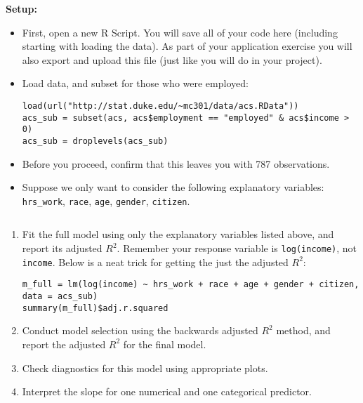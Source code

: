 \documentclass[11pt]{article}
\begin{document}
\pagebreak

\textbf{Setup:}

\begin{itemize}

\item First, open a new R Script. You will save all of your code here (including starting with loading the data). As part of your application exercise you will also export and upload this file (just like you will do in your project).

\item Load data, and subset for those who were employed:

\begin{verbatim}
load(url("http://stat.duke.edu/~mc301/data/acs.RData"))
acs_sub = subset(acs, acs$employment == "employed" & acs$income > 0)
acs_sub = droplevels(acs_sub)
\end{verbatim}

\item Before you proceed, confirm that this leaves you with 787 observations.

\item Suppose we only want to consider the following explanatory variables: \texttt{hrs\_work}, \texttt{race}, \texttt{age}, \texttt{gender}, \texttt{citizen}.

\end{itemize}

$\:$ \\

\begin{enumerate}

\item Fit the full model using only the explanatory variables listed above, and report its adjusted $R^2$. Remember your response variable is \texttt{log(income)}, not \texttt{income}. Below is a neat trick for getting the just the adjusted $R^2$:

\begin{verbatim}
m_full = lm(log(income) ~ hrs_work + race + age + gender + citizen, data = acs_sub)
summary(m_full)$adj.r.squared
\end{verbatim}

\item Conduct model selection using the backwards adjusted $R^2$ method, and report the adjusted $R^2$ for the final model.

\item Check diagnostics for this model using appropriate plots.

\item Interpret the slope for one numerical and one categorical predictor.

\end{enumerate}

%
\end{document}
